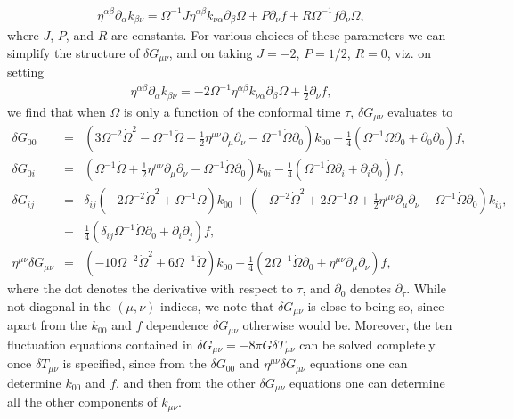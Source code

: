 \documentclass[aps]{revtex4}
\begin{document}
%
\begin{eqnarray}
\eta^{\alpha\beta}\partial_{\alpha}k_{\beta\nu} = \Omega^{-1} J \eta^{\alpha\beta}k_{\nu\alpha}\partial_\beta \Omega + P \partial_\nu f+ R \Omega^{-1} f\partial_\nu \Omega,
\label{D2}
\end{eqnarray}
%
where $J$, $P$, and $R$ are constants. For various choices of these parameters we can simplify the structure of $\delta G_{\mu\nu}$, and on taking  $J = -2$, $P = 1/2$, $R = 0$, viz. on setting
%
\begin{eqnarray}
\eta^{\alpha\beta}\partial_{\alpha}k_{\beta\nu} = -2 \Omega^{-1}  \eta^{\alpha\beta}k_{\nu\alpha}\partial_\beta \Omega + \tfrac{1}{2} \partial_\nu f,
\label{D3}
\end{eqnarray}
%
we find that when $\Omega$ is only a function of the conformal time $\tau$, $\delta G_{\mu\nu}$ evaluates  to 
%
\begin{eqnarray}
\delta G_{00}&=&
(3 \Omega^{-2} \dot{\Omega}^2 -  \Omega^{-1} \ddot{\Omega} + \tfrac{1}{2} \eta^{\mu \nu} \partial_{\mu} \partial_{\nu} -  \Omega^{-1} \dot{\Omega} \partial_{0}) k_{00} - \tfrac{1}{4} ( \Omega^{-1} \dot{\Omega} \partial_{0} + \partial_{0} \partial_{0}) f,
\nonumber\\
\delta G_{0i}&=&
(\Omega^{-1} \ddot{\Omega} + \tfrac{1}{2} \eta^{\mu \nu} \partial_{\mu} \partial_{\nu} -  \Omega^{-1} \dot{\Omega} \partial_{0}) k_{0i} - \tfrac{1}{4}  (\Omega^{-1} \dot{\Omega} \partial_{i} +\partial_{i} \partial_{0}) f,
\nonumber\\
\delta G_{ij}&=&
\delta_{ij}(-2 \Omega^{-2} \dot{\Omega}^2 + \Omega^{-1} \ddot{\Omega}) k_{00} + (- \Omega^{-2} \dot{\Omega}^2 + 2 \Omega^{-1} \ddot{\Omega} + \tfrac{1}{2} \eta^{\mu \nu} \partial_{\mu} \partial_{\nu} -  \Omega^{-1} \dot{\Omega} \partial_{0}) k_{ij}, 
\nonumber\\
&-& \tfrac{1}{4} (\delta_{ij} \Omega^{-1} \dot{\Omega} \partial_{0} + \partial_{i} \partial_{j}) f,
\nonumber\\
\eta^{\mu\nu}\delta G_{\mu\nu}&=&(-10\Omega^{-2} \dot{\Omega}^2 +6  \Omega^{-1} \ddot{\Omega})k_{00}- \tfrac{1}{4}  (2\Omega^{-1} \dot{\Omega} \partial_{0} +\eta^{\mu\nu}\partial_{\mu}\partial_{\nu}) f,
\label{D4}
\end{eqnarray}
%
where the dot denotes the derivative with respect to $\tau$, and $\partial_0$ denotes $\partial_{\tau}$. While not diagonal in the $(\mu,\nu)$ indices, we note that $\delta G_{\mu\nu}$ is close to being so, since apart from  the $k_{00}$ and $f$ dependence  $\delta G_{\mu\nu}$ otherwise would be. Moreover, the ten fluctuation equations contained in  $\delta G_{\mu\nu}=-8\pi G \delta T_{\mu\nu}$ can be solved completely once $\delta T_{\mu\nu}$ is specified, since from the $\delta G_{00}$ and $\eta^{\mu\nu}\delta G_{\mu\nu}$ equations one can determine $k_{00}$ and $f$, and then from the other $\delta G_{\mu\nu}$ equations one can determine all the other components of $k_{\mu\nu}$. 
\end{document}
